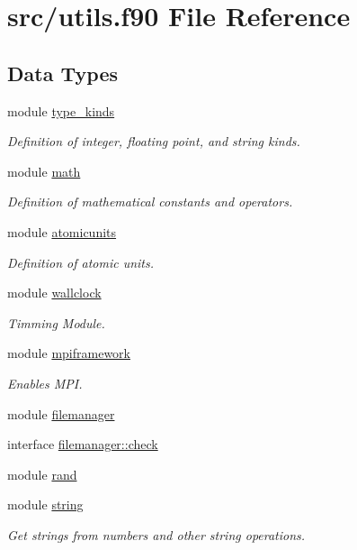 \hypertarget{utils_8f90}{\section{src/utils.f90 File Reference}
\label{utils_8f90}
}
\subsection*{Data Types}
\begin{DoxyCompactItemize}
\item 
module \hyperlink{classtype__kinds}{type\-\_\-kinds}
\begin{DoxyCompactList}\small\item\em Definition of integer, floating point, and string kinds. \end{DoxyCompactList}\item 
module \hyperlink{classmath}{math}
\begin{DoxyCompactList}\small\item\em Definition of mathematical constants and operators. \end{DoxyCompactList}\item 
module \hyperlink{classatomicunits}{atomicunits}
\begin{DoxyCompactList}\small\item\em Definition of atomic units. \end{DoxyCompactList}\item 
module \hyperlink{classwallclock}{wallclock}
\begin{DoxyCompactList}\small\item\em Timming Module. \end{DoxyCompactList}\item 
module \hyperlink{classmpiframework}{mpiframework}
\begin{DoxyCompactList}\small\item\em Enables M\-P\-I. \end{DoxyCompactList}\item 
module \hyperlink{classfilemanager}{filemanager}
\item 
interface \hyperlink{interfacefilemanager_1_1check}{filemanager\-::check}
\item 
module \hyperlink{classrand}{rand}
\item 
module \hyperlink{classstring}{string}
\begin{DoxyCompactList}\small\item\em Get strings from numbers and other string operations. \end{DoxyCompactList}\item 

\end{DoxyCompactItemize}
